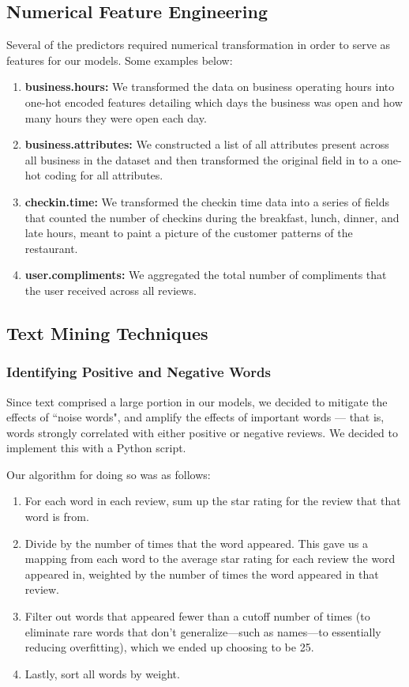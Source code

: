 \documentclass[10pt]{article}
\begin{document}
\subsection{Numerical Feature Engineering}
\label{nfe}
Several of the predictors required numerical transformation in order to serve as features for our models. Some examples below:
\begin{enumerate}[(1)]
    \item \textbf{business.hours:} We transformed the data on business operating hours into one-hot encoded features detailing which days the business was open and how many hours they were open each day.
    \item \textbf{business.attributes:} We constructed a list of all attributes present across all business in the dataset and then transformed the original field in to a one-hot coding for all attributes.
    \item \textbf{checkin.time:} We transformed the checkin time data into a series of fields that counted the number of checkins during the breakfast, lunch, dinner, and late hours, meant to paint a picture of the customer patterns of the restaurant.
    \item \textbf{user.compliments:} We aggregated the total number of compliments that the user received across all reviews.
\end{enumerate}

\subsection{Text Mining Techniques}
\subsubsection{Identifying Positive and Negative Words}
Since text comprised a large portion in our models, we decided to mitigate the effects of ``noise words", and amplify the effects of important words --- that is, words strongly correlated with either positive or negative reviews. We decided to implement this with a Python script.
\vspace{0.1in}

\noindent
Our algorithm for doing so was as follows:
\begin{enumerate}[(1)]
    \item For each word in each review, sum up the star rating for the review that that word is from. 
    \item Divide by the number of times that the word appeared. This gave us a mapping from each word to the average star rating for each review the word appeared in, weighted by the number of times the word appeared in that review.
    \item Filter out words that appeared fewer than a cutoff number of times (to eliminate rare words that don't generalize---such as names---to essentially reducing overfitting), which we ended up choosing to be 25.
    \item Lastly, sort all words by weight.
\end{enumerate}
\vspace{0.1in}
\end{document}
